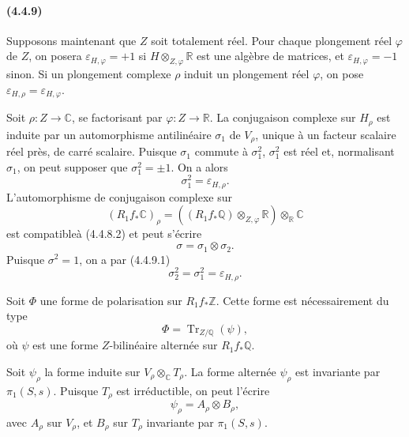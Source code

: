 \documentclass[10pt]{article}
\newcommand{\C}{\mathbb C}
\newcommand{\Q}{\mathbb Q}
\newcommand{\Z}{\mathbb Z}
\newcommand{\fg}{\guillemotright}
\newcommand{\og}{\guillemotleft}
\newcommand{\R}{\mathbb R}
\newcommand{\Tr}{\operatorname{Tr}}
\begin{document}
\paragraph{(4.4.9)} Supposons maintenant que $Z$ soit totalement réel. Pour chaque plongement réel $\varphi$ de $Z$, on posera $\varepsilon_{H,\varphi}=+1$ si $H\otimes_{Z,\varphi}\R$ est une algèbre de matrices, et $\varepsilon_{H,\varphi}=-1$ sinon. Si un plongement complexe $\rho$ induit un plongement réel $\varphi$, on pose $\varepsilon_{H,\rho}=\varepsilon_{H,\varphi}$.

Soit $\rho:Z\to\C$, se factorisant par $\varphi:Z\to\R$. La conjugaison complexe sur $H_\rho$ est induite par un automorphisme antilinéaire $\sigma_1$ de $V_\rho$, unique à un facteur scalaire réel près, de carré scalaire. Puisque $\sigma_1$ commute à $\sigma_1^2$, $\sigma_1^2$ est réel et, normalisant $\sigma_1$, on peut supposer que $\sigma_1^2=\pm1$. On a alors
\[
\tag{4.4.9.1}
\sigma_1^2=\varepsilon_{H,\rho}.
\]
L'automorphisme de conjugaison complexe sur
\[
(R_1f_*\C)_\rho=((R_1f_*\Q)\otimes_{Z,\varphi}\R)\otimes_\R\C
\]
est \og compatible\fg à (4.4.8.2) et peut s'écrire
\[
\sigma=\sigma_1\otimes\sigma_2.
\]
Puisque $\sigma^2=1$, on a par (4.4.9.1)
\[
\tag{4.4.9.2}
\sigma_2^2=\sigma_1^2=\varepsilon_{H,\rho}.
\]

Soit $\Phi$ une forme de polarisation sur $R_1f_*\Z$. Cette forme est nécessairement du type
\[
\Phi=\Tr_{Z/\Q}(\psi),
\]
où $\psi$ est une forme $Z$-bilinéaire alternée sur $R_1f_*\Q$.

Soit $\psi_\rho$ la forme induite sur $V_\rho\otimes_\C T_\rho$. La forme alternée $\psi_\rho$ est invariante par $\pi_1(S,s)$. Puisque $T_\rho$ est irréductible, on peut l'écrire
\[
\tag{4.4.9.3}
\psi_\rho=A_\rho\otimes B_\rho,
\]
avec $A_\rho$ sur $V_\rho$, et $B_\rho$ sur $T_\rho$ invariante par $\pi_1(S,s)$.
\end{document}

